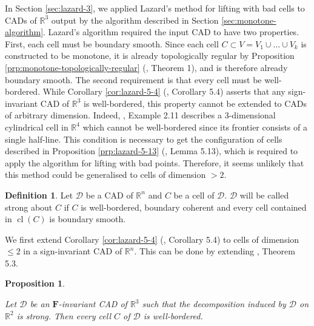 \documentclass[
]{book}
\newtheorem{proposition}{Proposition}[chapter]
\theoremstyle{definition}
\newtheorem{definition}{Definition}[chapter]
\theoremstyle{definition}
\theoremstyle{definition}
\theoremstyle{definition}
\theoremstyle{remark}
\begin{document}
In Section \ref{sec:lazard-3}, we applied Lazard's method for lifting with bad cells to CADs of \(\mathbb{R}^3\) output by the algorithm described in Section \ref{sec:monotone-algorithm}. Lazard's algorithm required the input CAD to have two properties. First, each cell must be boundary smooth. Since each cell \(C \subset V = V_1\cup \ldots \cup V_k\) is constructed to be monotone, it is already topologically regular by Proposition \ref{prp:monotone-topologically-regular} (\citet{bgv13}, Theorem 1), and is therefore already boundary smooth.
The second requirement is that every cell must be well-bordered. While Corollary \ref{cor:lazard-5-4} (\citet{lazard10}, Corollary 5.4) asserts that any sign-invariant CAD of \(\mathbb{R}^3\) is well-bordered, this property cannot be extended to CADs of arbitrary dimension. Indeed, \citet{lazard10}, Example 2.11 describes a \(3\)-dimensional cylindrical cell in \(\mathbb{R}^4\) which cannot be well-bordered since its frontier consists of a single half-line. This condition is necessary to get the configuration of cells described in Proposition \ref{prp:lazard-5-13} (\citet{lazard10}, Lemma 5.13), which is required to apply the algorithm for lifting with bad points. Therefore, it seems unlikely that this method could be generalised to cells of dimension \(> 2\).

\begin{definition}
\protect\hypertarget{def:strong-about-c}{}\label{def:strong-about-c}Let \(\mathcal{D}\) be a CAD of \(\mathbb{R}^n\) and \(C\) be a cell of \(\mathcal{D}\). \(\mathcal{D}\) will be called strong about \(C\) if \(C\) is well-bordered, boundary coherent and every cell contained in \({\operatorname{cl} \left( C \right)}\) is boundary smooth.
\end{definition}

We first extend Corollary \ref{cor:lazard-5-4} (\citet{lazard10}, Corollary 5.4) to cells of dimension \(\le 2\) in a sign-invariant CAD of \(\mathbb{R}^n\).
This can be done by extending \citet{lazard10}, Theorem 5.3.

\begin{proposition}
\protect\hypertarget{prp:lazard-5-3}{}\label{prp:lazard-5-3}\citep[Theorem 5.3]{lazard10}

Let \(\mathcal{D}\) be an \(\mathbf{F}\)-invariant CAD of \(\mathbb{R}^3\) such that the decomposition induced by \(\mathcal{D}\) on \(\mathbb{R}^2\) is strong. Then every cell \(C\) of \(\mathcal{D}\) is well-bordered.
\end{proposition}
\end{document}
